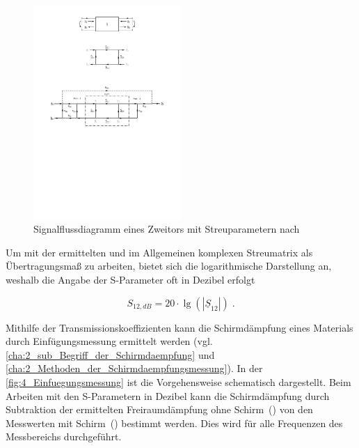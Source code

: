 \begin{figure}[ht]
    \centering
    \includegraphics[page = 1, trim = 5.9cm 19.2cm 5.9cm 5cm, clip, width = 0.5\textwidth]{Abbildungen/Kapitel4/Zweitor.pdf}
    \caption[Signalflussdiagramm eines Zweitors mit Streuparametern]{Signalflussdiagramm eines Zweitors mit Streuparametern nach~\cite{Grundkurs_Hochfrequenztechnik}}
    \label{fig:4_Signalflussdiagramm_Zweitor}
\end{figure}

Um mit der ermittelten und im Allgemeinen komplexen Streumatrix als Übertragungsmaß zu arbeiten, bietet sich die logarithmische Darstellung an, weshalb die Angabe der S-Parameter oft in Dezibel erfolgt~\cite{Grundkurs_Hochfrequenztechnik} 

\begin{equation}
    S_{12, dB} = 20 \cdot \lg \left( \left| \underline{S}_{12} \right| \right) \; \text{.} \label{eq:4_Schirmdaempfung_Dezibel}
\end{equation}


Mithilfe der Transmissionskoeffizienten kann die Schirmdämpfung eines Materials durch Einfügungs\-messung ermittelt werden (vgl. \Abschnitte\ref{cha:2_sub_Begriff_der_Schirmdaempfung} und \ref{cha:2_Methoden_der_Schirmdaempfungsmessung}). In der \Abb\ref{fig:4_Einfuegungsmessung} ist die Vorgehensweise schematisch dargestellt. Beim Arbeiten mit den S-Parametern in Dezibel kann die Schirmdämpfung durch Subtraktion der ermittelten Freiraumdämpfung ohne Schirm~\mbox{()} von den Messwerten mit Schirm~\mbox{()} bestimmt werden. Dies wird für alle Frequenzen des Messbereichs durchgeführt.
\par



